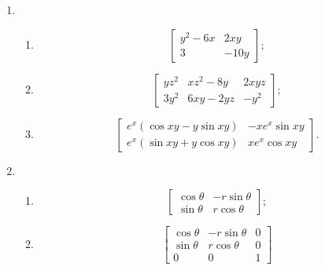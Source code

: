% 
\begin{enumerate}
    \item %
        \begin{enumerate}[(1)]
            \item %
                \[
                    \begin{bmatrix}
                        y^2-6x & 2xy \\
                        3 & -10y
                    \end{bmatrix};    
                \]
            \item %
                \[
                    \begin{bmatrix}
                        yz^2 & xz^2-8y & 2xyz \\
                        3y^2 & 6xy - 2yz & -y^2
                    \end{bmatrix};
                \]
            \item %
                \[
                    \begin{bmatrix}
                        e^x(\cos{xy} - y\sin{xy}) & -xe^x\sin{xy} \\
                        e^x(\sin{xy} + y\cos{xy}) & xe^x\cos{xy}
                    \end{bmatrix}.    
                \]
        \end{enumerate}
    \item %
        \begin{enumerate}[(1)]
            \item %
                \[
                    \begin{bmatrix}
                        \cos\theta & -r\sin\theta \\
                        \sin\theta & r\cos\theta
                    \end{bmatrix};    
                \]
            \item %
                \[
                    \begin{bmatrix}
                        \cos\theta & -r\sin\theta & 0 \\
                        \sin\theta & r\cos\theta & 0 \\
                        0 & 0 & 1

\end{bmatrix}\]
\end{enumerate}
\end{enumerate}
